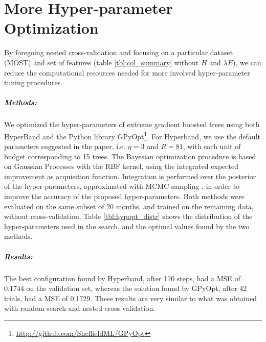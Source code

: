 \documentclass[a4paper]{book}
\begin{document}
\chapter{More Hyper-parameter Optimization}
By foregoing nested cross-validation and focusing on a particular dataset (MOST) and set of features (table \ref{tbl:col_summary} without $H$ and $\lambda E$), we can reduce the computational resources needed for more involved hyper-parameter tuning procedures.

\paragraph{Methods:} We optimized the hyper-parameters of extreme gradient boosted trees \citep{xgboost} using both HyperBand \citep{hyperband} and the Python library GPyOpt\footnote{\url{http://github.com/SheffieldML/GPyOpt}}. For Hyperband, we use the default parameters suggested in the paper, i.e. $\eta=3$ and $R=81$, with each unit of budget corresponding to 15 trees. The Bayesian optimization procedure is based on Gaussian Processes with the RBF kernel, using the integrated expected improvement as acquisition function. Integration is performed over the posterior of the hyper-parameters, approximated with MCMC sampling \citep{practical_gphypopt}, in order to improve the accuracy of the proposed hyper-parameters. Both methods were evaluated on the same subset of 20 months, and trained on the remaining data, without cross-validation. Table \ref{tbl:hypopt_distr} shows the distribution of the hyper-parameters used in the search, and the optimal values found by the two methods.

\paragraph{Results:} The best configuration found by Hyperband, after 170 steps, had a MSE of 0.1744 on the validation set, whereas the solution found by GPyOpt, after 42 trials, had a MSE of 0.1729. These results are very similar to what was obtained with random search and nested cross validation.
\end{document}

